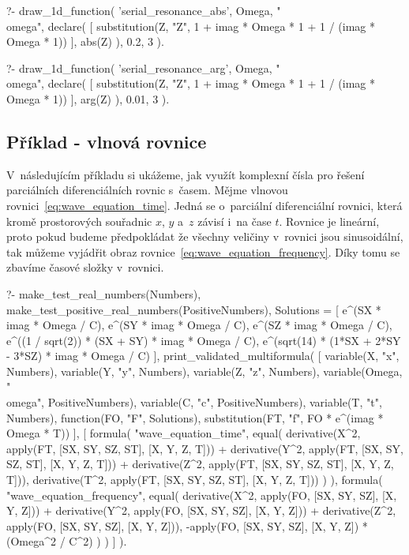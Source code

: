 \begin{prolog}
?-	draw_1d_function(
		'serial_resonance_abs',
		Omega,
		"\\omega",
		declare(
			[
				substitution(Z, "Z", 1 + imag * Omega * 1 + 1 / (imag * Omega * 1))
			],
			abs(Z)
		),
		0.2, 3
	).				
\end{prolog}

\begin{prolog}
?-	draw_1d_function(
		'serial_resonance_arg',
		Omega,
		"\\omega",
		declare(
			[
				substitution(Z, "Z", 1 + imag * Omega * 1 + 1 / (imag * Omega * 1))
			],
			arg(Z)
		),
		0.01, 3
	).				
\end{prolog}

\subsection{Příklad - vlnová rovnice}

V~následujícím příkladu si ukážeme, jak využít komplexní čísla pro řešení parciálních diferenciálních rovnic s~časem. Mějme vlnovou rovnici~\eqref{eq:wave_equation_time}.  Jedná se o~parciální diferenciální rovnici, která kromě prostorových souřadnic \(x\), \(y\) a~\(z\) závisí i~na čase \(t\). Rovnice je lineární, proto pokud budeme předpokládat že všechny veličiny v~rovnici jsou sinusoidální, tak můžeme vyjádřit obraz rovnice~\eqref{eq:wave_equation_frequency}. Díky tomu se zbavíme časové složky v~rovnici.

\begin{prolog}
?-	make_test_real_numbers(Numbers),
	make_test_positive_real_numbers(PositiveNumbers),
	Solutions = [
		e^(SX * imag * Omega / C),
		e^(SY * imag * Omega / C),
		e^(SZ * imag * Omega / C),
		e^((1 / sqrt(2)) * (SX + SY) * imag * Omega / C),
		e^(sqrt(14) * (1*SX + 2*SY - 3*SZ) * imag * Omega / C)
	],
	print_validated_multiformula(
		[
			variable(X, "x", Numbers),
			variable(Y, "y", Numbers),
			variable(Z, "z", Numbers),
			variable(Omega, "\\omega", PositiveNumbers),
			variable(C, "c", PositiveNumbers),
			variable(T, "t", Numbers),
			function(FO, "F", Solutions),
			substitution(FT, "f", FO * e^(imag * Omega * T))
		],
		[
			formula(
				"wave_equation_time",
				equal(
					derivative(X^2, apply(FT, [SX, SY, SZ, ST], [X, Y, Z, T])) +
					derivative(Y^2, apply(FT, [SX, SY, SZ, ST], [X, Y, Z, T])) +
					derivative(Z^2, apply(FT, [SX, SY, SZ, ST], [X, Y, Z, T])),
					derivative(T^2, apply(FT, [SX, SY, SZ, ST], [X, Y, Z, T]))
				)
			),
			formula(
				"wave_equation_frequency",
				equal(
					derivative(X^2, apply(FO, [SX, SY, SZ], [X, Y, Z])) +
					derivative(Y^2, apply(FO, [SX, SY, SZ], [X, Y, Z])) +
					derivative(Z^2, apply(FO, [SX, SY, SZ], [X, Y, Z])),
					-apply(FO, [SX, SY, SZ], [X, Y, Z]) * (Omega^2 / C^2)
				)
			)
		]
	).
\end{prolog}


